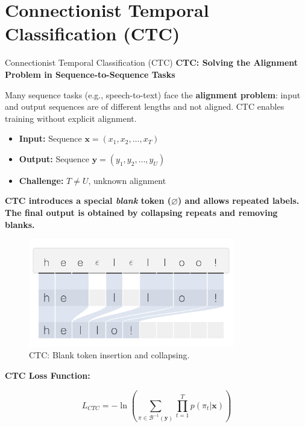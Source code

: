 \section{Connectionist Temporal Classification (CTC)}

\begin{frame}[t,allowframebreaks]{Connectionist Temporal Classification (CTC)}
    \textbf{CTC: Solving the Alignment Problem in Sequence-to-Sequence Tasks}

    Many sequence tasks (e.g., speech-to-text) face the \textbf{alignment problem}: input and output sequences are of different lengths and not aligned. CTC enables training without explicit alignment.

    \begin{itemize}
        \item \textbf{Input:} Sequence $\mathbf{x} = (x_1, x_2, \ldots, x_T)$
        \item \textbf{Output:} Sequence $\mathbf{y} = (y_1, y_2, \ldots, y_U)$
        \item \textbf{Challenge:} $T \neq U$, unknown alignment
    \end{itemize}

    \textbf{CTC introduces a special \emph{blank} token ($\varnothing$) and allows repeated labels. The final output is obtained by collapsing repeats and removing blanks.}

    \begin{figure}[h!]
        \centering
        \includegraphics[width=0.8\textwidth]{images/audio-nlp/ctc.png}
        \caption*{CTC: Blank token insertion and collapsing.}
    \end{figure}

    \textbf{CTC Loss Function:}

    \begin{equation}
        L_{CTC} = -\ln \left( \sum_{\pi \in \mathcal{B}^{-1}(\mathbf{y})} \prod_{t=1}^{T} p(\pi_t | \mathbf{x}) \right)
    \end{equation}


\end{frame}
